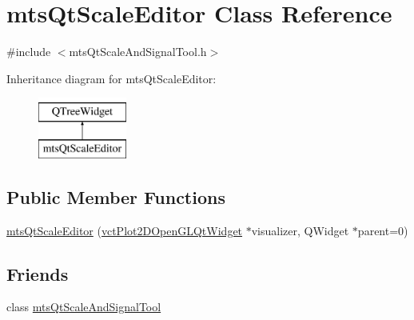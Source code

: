 \hypertarget{classmts_qt_scale_editor}{\section{mts\-Qt\-Scale\-Editor Class Reference}
\label{classmts_qt_scale_editor}
}


{\ttfamily \#include $<$mts\-Qt\-Scale\-And\-Signal\-Tool.\-h$>$}

Inheritance diagram for mts\-Qt\-Scale\-Editor\-:\begin{figure}[H]
\begin{center}
\leavevmode
\includegraphics[height=2.000000cm]{dd/dd9/classmts_qt_scale_editor}
\end{center}
\end{figure}
\subsection*{Public Member Functions}
\begin{DoxyCompactItemize}
\item 
\hyperlink{classmts_qt_scale_editor_af5a4e139d02a7291f0d837df58d57d45}{mts\-Qt\-Scale\-Editor} (\hyperlink{classvct_plot2_d_open_g_l_qt_widget}{vct\-Plot2\-D\-Open\-G\-L\-Qt\-Widget} $\ast$visualizer, Q\-Widget $\ast$parent=0)
\end{DoxyCompactItemize}
\subsection*{Friends}
\begin{DoxyCompactItemize}
\item 
class \hyperlink{classmts_qt_scale_editor_a9600f951fd4e3eb991ffb337d453aec5}{mts\-Qt\-Scale\-And\-Signal\-Tool}
\end{DoxyCompactItemize}


